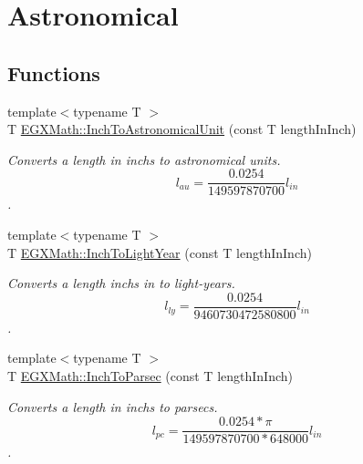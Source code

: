 \hypertarget{group___e_g_x_math-_conversions-_length_conversions-_imperial-_inch-_astronomical}{}\section{Astronomical}
\label{group___e_g_x_math-_conversions-_length_conversions-_imperial-_inch-_astronomical}
\subsection*{Functions}
\begin{DoxyCompactItemize}
\item 
{\footnotesize template$<$typename T $>$ }\\T \mbox{\hyperlink{group___e_g_x_math-_conversions-_length_conversions-_imperial-_inch-_astronomical_ga3d2920dc1a8ee693fd011be23d37c5ca}{E\+G\+X\+Math\+::\+Inch\+To\+Astronomical\+Unit}} (const T length\+In\+Inch)
\begin{DoxyCompactList}\small\item\em Converts a length in inchs to astronomical units. \[ l_{au}=\frac{0.0254}{149597870700} l_{in} \]. \end{DoxyCompactList}\item 
{\footnotesize template$<$typename T $>$ }\\T \mbox{\hyperlink{group___e_g_x_math-_conversions-_length_conversions-_imperial-_inch-_astronomical_ga3dc74f0303c8db4674f23ba6a99d150b}{E\+G\+X\+Math\+::\+Inch\+To\+Light\+Year}} (const T length\+In\+Inch)
\begin{DoxyCompactList}\small\item\em Converts a length inchs in to light-\/years. \[ l_{ly}=\frac{0.0254}{9460730472580800} l_{in} \]. \end{DoxyCompactList}\item 
{\footnotesize template$<$typename T $>$ }\\T \mbox{\hyperlink{group___e_g_x_math-_conversions-_length_conversions-_imperial-_inch-_astronomical_ga5a93231e0372e2fe2c27ef5405175784}{E\+G\+X\+Math\+::\+Inch\+To\+Parsec}} (const T length\+In\+Inch)
\begin{DoxyCompactList}\small\item\em Converts a length in inchs to parsecs. \[ l_{pc}=\frac{0.0254 * \pi}{149597870700 * 648000} l_{in} \]. \end{DoxyCompactList}\end{DoxyCompactItemize}


